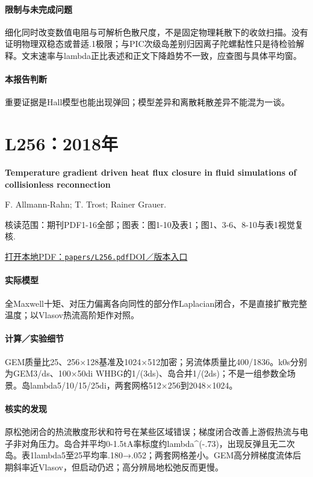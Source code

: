 \paragraph{限制与未完成问题}细化同时改变数值电阻与可解析色散尺度，不是固定物理耗散下的收敛扫描。没有证明物理双稳态或普适.1极限；与PIC次级岛差别归因离子陀螺黏性只是待检验解释。文末速率与lambda正比表述和正文下降趋势不一致，应查图与具体平均窗。

\paragraph{本报告判断}重要证据是Hall模型也能出现弹回；模型差异和离散耗散差异不能混为一谈。

\section{L256：2018年}\label{paper:L256}

\textbf{Temperature gradient driven heat flux closure in fluid simulations of collisionless reconnection}\citep{L256}\

F. Allmann‐Rahn;  T. Trost;  Rainer Grauer.

\textsf{核读范围：}期刊PDF1-16全部；\textsf{图表：}图1-10及表1；图1、3-6、8-10与表1视觉复核.

\href{run:papers/L256.pdf}{打开本地PDF：\texttt{papers/L256.pdf}}\quad\href{https://doi.org/10.1017/s002237781800048x}{DOI／版本入口}

\paragraph{实际模型}全Maxwell十矩、对压力偏离各向同性的部分作Laplacian闭合，不是直接扩散完整温度；以Vlasov热流高阶矩作对照。

\paragraph{计算／实验细节}GEM质量比25、256×128基准及1024×512加密；另流体质量比400/1836。k0s分别为GEM3/ds、100×50di WHBG的1/(3ds)、岛合并1/(2ds)；不是一组参数全场景。岛lambda5/10/15/25di，两套网格512×256到2048×1024。

\paragraph{核实的发现}原松弛闭合的热流散度形状和符号在某些区域错误；梯度闭合改善上游假热流与电子非对角压力。岛合并平均0-1.5tA率标度约lambda\textasciicircum{}(-.73)，出现反弹且无二次岛。表1lambda5至25平均率.180→.052；两套网格差小。GEM高分辨梯度流体后期斜率近Vlasov，但启动仍迟；高分辨局地松弛反而更慢。

